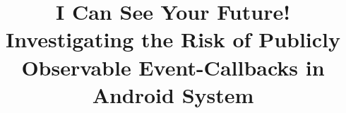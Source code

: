\documentclass{sig-alternate-05-2015}
\begin{document}






%

\title{I Can See Your Future! Investigating the Risk of Publicly Observable Event-Callbacks in Android System}

%
%
%
%
%
\end{document}
